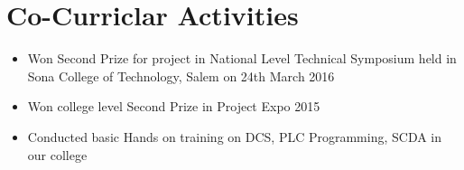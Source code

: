 \documentclass{My_CV_Class}
\begin{document}
\section{Co-Curriclar Activities}
\begin{itemize}
	\item Won Second Prize for project in National Level Technical Symposium held in Sona College of Technology, Salem on 24th March 2016
	\item Won college level Second Prize in Project Expo 2015
	\item Conducted basic Hands on training on DCS, PLC Programming, SCDA in our college
\end{itemize}
\end{document}
